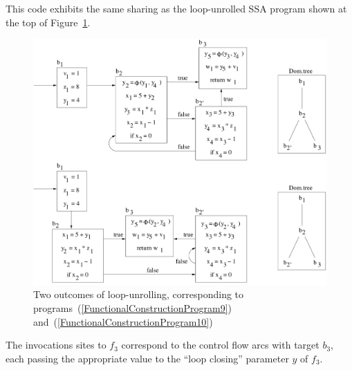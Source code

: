 This code exhibits the same sharing as the loop-unrolled SSA program
shown at the top of
Figure~\ref{fig:FunctionalCorrespondenceSSAofLoopClosedProgram}.
\begin{figure}
\begin{center}
\includegraphics[scale=0.4]{SSAConstructionExample4}
\end{center}
\caption{\label{fig:FunctionalCorrespondenceSSAofLoopClosedProgram} Two outcomes of loop-unrolling, corresponding to programs~(\ref{FunctionalConstructionProgram9}) and~(\ref{FunctionalConstructionProgram10})}
\end{figure}
The invocations sites to $f_3$ correspond to the control flow arcs
with target $b_3$, each passing the appropriate value to the ``loop
closing'' parameter $y$ of $f_3$.


